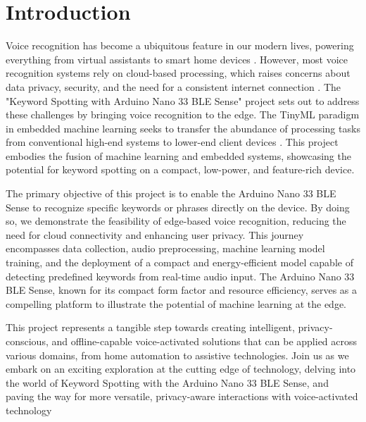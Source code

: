 %
%

\chapter{Introduction}

Voice recognition has become a ubiquitous feature in our modern lives, powering everything from virtual assistants to smart home devices \cite{Waqar:2021}. However, most voice recognition systems rely on cloud-based processing, which raises concerns about data privacy, security, and the need for a consistent internet connection \cite{Dutta:2021, Gimenez:2022b}. The "Keyword Spotting with Arduino Nano 33 BLE Sense" project sets out to address these challenges by bringing voice recognition to the edge. The TinyML paradigm in embedded machine learning seeks to transfer the abundance of processing tasks from conventional high-end systems to lower-end client devices \cite{Ray:2022}. This project embodies the fusion of machine learning and embedded systems, showcasing the potential for keyword spotting on a compact, low-power, and feature-rich device. 

The primary objective of this project is to enable the Arduino Nano 33 BLE Sense to recognize specific keywords or phrases directly on the device. By doing so, we demonstrate the feasibility of edge-based voice recognition, reducing the need for cloud connectivity and enhancing user privacy. This journey encompasses data collection, audio preprocessing, machine learning model training, and the deployment of a compact and energy-efficient model capable of detecting predefined keywords from real-time audio input. The Arduino Nano 33 BLE Sense, known for its compact form factor and resource efficiency, serves as a compelling platform to illustrate the potential of machine learning at the edge.

This project represents a tangible step towards creating intelligent, privacy-conscious, and offline-capable voice-activated solutions that can be applied across various domains, from home automation to assistive technologies. Join us as we embark on an exciting exploration at the cutting edge of technology, delving into the world of Keyword Spotting with the Arduino Nano 33 BLE Sense, and paving the way for more versatile, privacy-aware interactions with voice-activated technology


